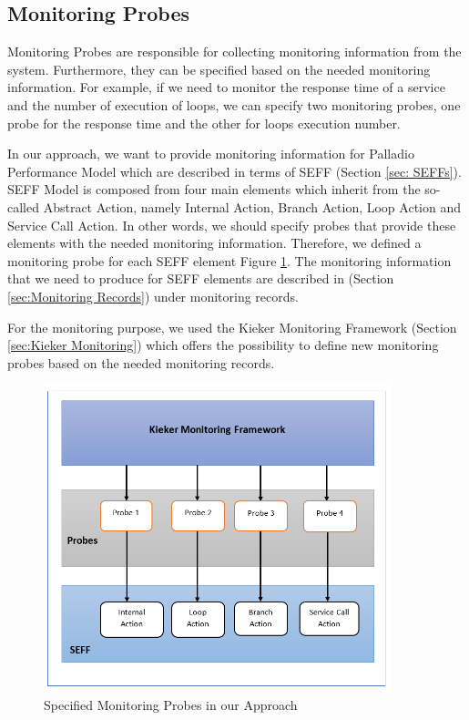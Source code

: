 \subsection{Monitoring Probes}
\label{sec:Monitoring Probes}
Monitoring Probes are responsible for collecting monitoring information from the system. Furthermore, they can be specified based on the needed monitoring information. For example, if we need to monitor the response time of a service and the number of execution of loops, we can specify two monitoring probes, one probe for the response time and the other for loops execution number. 

In our approach, we want to provide monitoring information for Palladio Performance Model which are described in terms of SEFF (Section \ref{sec: SEFFs}).   SEFF Model is composed from four main elements which inherit from the so-called Abstract Action, namely Internal Action, Branch Action, Loop Action and Service Call Action. In other words, we should specify probes that provide these elements with the needed monitoring information. Therefore, we defined a monitoring probe for each SEFF element Figure \ref{fig:Specified Monitoring Probes in our Approach}. The monitoring information that we need to produce for SEFF elements are described in (Section \ref{sec:Monitoring Records}) under monitoring records.  

For the monitoring purpose, we used the Kieker Monitoring Framework (Section \ref{sec:Kieker Monitoring}) which offers the possibility to define new monitoring probes based on the needed monitoring records.

\begin{figure}[h]
\centering
\includegraphics[width=0.9\textwidth]{figures/probes}
\caption{Specified Monitoring Probes in our Approach}
\label{fig:Specified Monitoring Probes in our Approach}
\end{figure}

